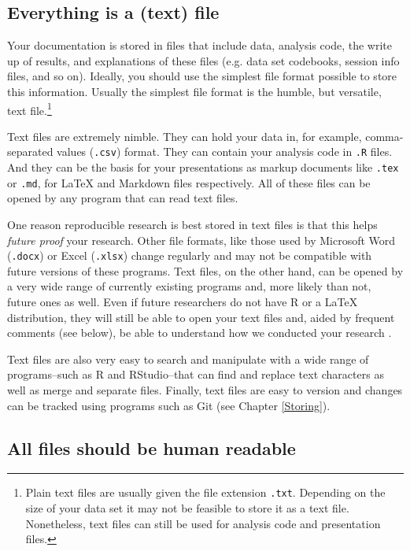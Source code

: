 \documentclass[krantz1]{krantz}
\begin{document}
\subsection{Everything is a (text) file}

Your documentation is stored in files that include data, analysis code, the write up of results, and explanations of these files (e.g. data set codebooks, session info files, and so on). Ideally, you should use the simplest file format possible to store this information. Usually the simplest file format  is the humble, but versatile, text file.\footnote{Plain text files are usually given the file extension \texttt{.txt}. Depending on the size of your data set it may not be feasible to store it as a text file. Nonetheless, text files can still be used for analysis code and presentation files.}

Text files are extremely nimble. They can hold your data in, for example, comma-separated values ({\tt{.csv}})  format. They can contain your analysis code in {\tt{.R}} files. And they can be the basis for your presentations as markup documents like {\tt{.tex}} or {\tt{.md}}, for LaTeX and Markdown files respectively. All of these files can be opened by any program that can read text files. 

One reason reproducible research is best stored in text files is that this helps {\emph{future proof}} your research. Other file formats, like those used by Microsoft Word  (\texttt{.docx}) or Excel (\texttt{.xlsx}) change regularly and may not be compatible with future versions of these programs. Text files, on the other hand, can be opened by a very wide range of currently existing programs and, more likely than not, future ones as well. Even if future researchers do not have R or a LaTeX distribution, they will still be able to open your text files and, aided by frequent comments (see below), be able to understand how we conducted your research \cite[3]{Bowers2011}.

Text files are also very easy to search and manipulate with a wide range of programs--such as R and RStudio--that can find and replace text characters as well as merge and separate files. Finally, text files are easy to version and changes can be tracked using programs such as Git (see Chapter \ref{Storing}).   

\subsection{All files should be human readable}
\end{document}

